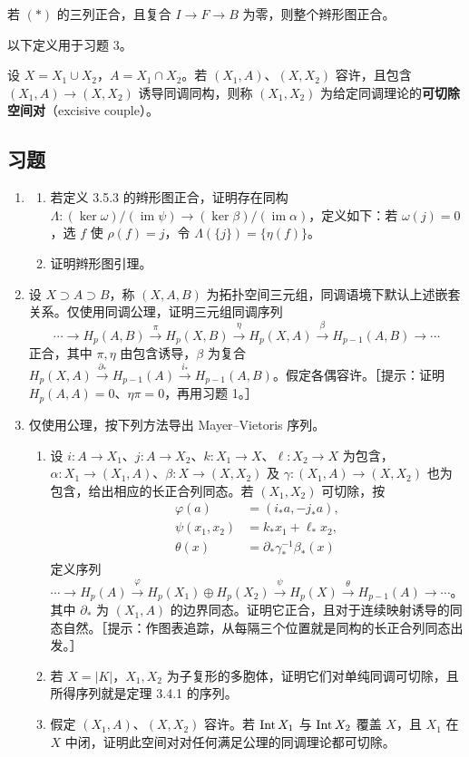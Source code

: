 若 $(*)$ 的三列正合，且复合 $I\to F\to B$ 为零，则整个辫形图正合。

以下定义用于习题 3。

设 $X=X_1\cup X_2$，$A=X_1\cap X_2$。若 $(X_1,A)$、$(X,X_2)$ 容许，且包含 $(X_1,A)\to(X,X_2)$ 诱导同调同构，则称 $(X_1,X_2)$ 为给定同调理论的\textbf{可切除空间对}（excisive couple）。

\subsection*{习题}
\begin{enumerate}
\item \begin{enumerate}[label=(\alph*)]
\item 若定义 3.5.3 的辫形图正合，证明存在同构 $\Lambda:(\ker\omega)/(\operatorname{im}\psi)\to(\ker\beta)/(\operatorname{im}\alpha)$，定义如下：若 $\omega(j)=0$，选 $f$ 使 $\rho(f)=j$，令 $\Lambda(\{j\})=\{\eta(f)\}$。
\item 证明辫形图引理。
\end{enumerate}
\item 设 $X\supset A\supset B$，称 $(X,A,B)$ 为拓扑空间三元组，同调语境下默认上述嵌套关系。仅使用同调公理，证明三元组同调序列
\[
\cdots\to H_p(A,B)\xrightarrow{\pi}H_p(X,B)\xrightarrow{\eta}H_p(X,A)
\xrightarrow{\beta}H_{p-1}(A,B)\to\cdots
\]
正合，其中 $\pi,\eta$ 由包含诱导，$\beta$ 为复合 $H_p(X,A)\xrightarrow{\partial_*}H_{p-1}(A)\xrightarrow{i_*}H_{p-1}(A,B)$。假定各偶容许。［提示：证明 $H_p(A,A)=0$、$\eta\pi=0$，再用习题 1。］
\item 仅使用公理，按下列方法导出 Mayer--Vietoris 序列。
\begin{enumerate}[label=(\alph*)]
\item 设 $i:A\to X_1$、$j:A\to X_2$、$k:X_1\to X$、$\ell:X_2\to X$ 为包含，$\alpha:X_1\to(X_1,A)$、$\beta:X\to(X,X_2)$ 及 $\gamma:(X_1,A)\to(X,X_2)$ 也为包含，给出相应的长正合列同态。若 $(X_1,X_2)$ 可切除，按
\[
\begin{aligned}
\varphi(a)&=(i_*a,-j_*a),\\
\psi(x_1,x_2)&=k_*x_1+\ell_*x_2,\\
\theta(x)&=\partial_*\gamma_*^{-1}\beta_*(x)
\end{aligned}
\]
定义序列 $\cdots\to H_p(A)\xrightarrow{\varphi}H_p(X_1)\oplus H_p(X_2)\xrightarrow{\psi}H_p(X)\xrightarrow{\theta}H_{p-1}(A)\to\cdots$。其中 $\partial_*$ 为 $(X_1,A)$ 的边界同态。证明它正合，且对于连续映射诱导的同态自然。［提示：作图表追踪，从每隔三个位置就是同构的长正合列同态出发。］
\item 若 $X=|K|$，$X_1,X_2$ 为子复形的多胞体，证明它们对单纯同调可切除，且所得序列就是定理 3.4.1 的序列。
\item 假定 $(X_1,A)$、$(X,X_2)$ 容许。若 $\operatorname{Int} X_1$ 与 $\operatorname{Int} X_2$ 覆盖 $X$，且 $X_1$ 在 $X$ 中闭，证明此空间对对任何满足公理的同调理论都可切除。
\end{enumerate}
\end{enumerate}
